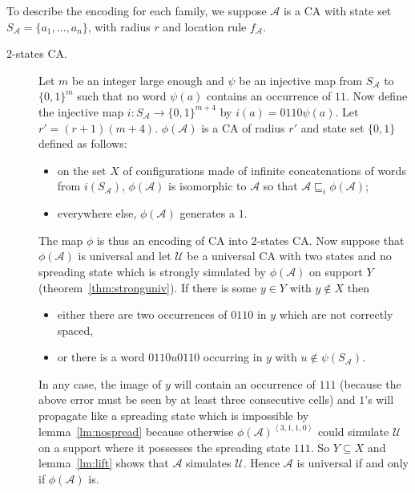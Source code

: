\documentclass[a4paper]{elsarticle}
\newcommand{\ACA}{\mathcal{A}}
\newcommand{\ACU}{\mathcal{U}}
\newcommand{\locA}{f_{\ACA}}
\newcommand\alphabe[1]{S_{#1}}
\newcommand{\alphA}{\alphabe{\ACA}}
\newcommand\sac{\sqsubseteq}
\newcommand\bulk[2]{{#1}^{\left\langle{#2}\right\rangle}}
\newcommand\cod{\phi}
\begin{document}
\begin{pf}
  To describe the encoding for each family, we suppose $\ACA$ is a CA
  with state set ${\alphA=\{a_1,\ldots,a_n\}}$, with radius $r$ and
  location rule $\locA$.
  \begin{description}
  \item[$2$-states CA.] Let $m$ be an integer large enough and $\psi$
    be an injective map from $\alphA$ to ${\{0,1\}^m}$ such that no
    word $\psi(a)$ contains an occurrence of $11$. Now define the
    injective map ${i:\alphA\rightarrow\{0,1\}^{m+4}}$ by
    ${i(a)=0110\psi(a)}$. Let ${r'=(r+1)(m+4)}$. ${\cod(\ACA)}$ is a
    CA of radius $r'$ and state set ${\{0,1\}}$ defined as follows:
    \begin{itemize}
    \item on the set $X$ of configurations made of infinite
      concatenations of words from $i(\alphA)$, $\cod(\ACA)$ is
      isomorphic to $\ACA$ so that ${\ACA\sac_i\cod(\ACA)}$;
    \item everywhere else, $\cod(\ACA)$ generates a $1$.
    \end{itemize}
    The map $\cod$ is thus an encoding of CA into $2$-states CA. Now
    suppose that $\cod(\ACA)$ is universal and let $\ACU$ be a
    universal CA with two states and no spreading state which is
    strongly simulated by $\cod(\ACA)$ on support $Y$
    (theorem~\ref{thm:stronguniv}). If there is some ${y\in Y}$ with
    ${y\not\in X}$ then
    \begin{itemize}
    \item either there are two occurrences of $0110$ in $y$ which are
      not correctly spaced,
    \item or there is a word ${0110u0110}$ occurring in $y$ with
      ${u\not\in\psi(\alphA)}$.
    \end{itemize}
    In any case, the image of $y$ will contain an occurrence of $111$
    (because the above error must be seen by at least three consecutive
    cells) and $1$'s will propagate like a spreading state which is
    impossible by lemma~\ref{lm:nospread} because otherwise
    $\bulk{\cod(\ACA)}{3,1,1,0}$ could simulate $\ACU$ on a support
    where it possesses the spreading state $111$. So ${Y\subseteq X}$
    and lemma~\ref{lm:lift} shows that $\ACA$ simulates $\ACU$. Hence
    $\ACA$ is universal if and only if $\cod(\ACA)$ is.


\end{description}
\end{pf}
\end{document}
